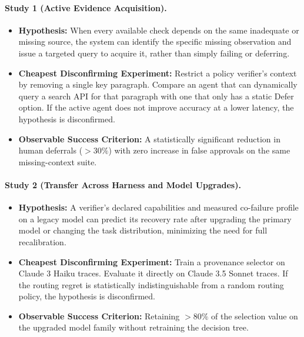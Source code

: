\documentclass[manuscript,screen,nonacm]{acmart}
\begin{document}
\paragraph{Study 1 (Active Evidence Acquisition).}
\begin{itemize}
    \item \textbf{Hypothesis:} When every available check depends on the same inadequate or missing source, the system can identify the specific missing observation and issue a targeted query to acquire it, rather than simply failing or deferring.
    \item \textbf{Cheapest Disconfirming Experiment:} Restrict a policy verifier's context by removing a single key paragraph. Compare an agent that can dynamically query a search API for that paragraph with one that only has a static Defer option. If the active agent does not improve accuracy at a lower latency, the hypothesis is disconfirmed.
    \item \textbf{Observable Success Criterion:} A statistically significant reduction in human deferrals ($>30\%$) with zero increase in false approvals on the same missing-context suite.
\end{itemize}

\paragraph{Study 2 (Transfer Across Harness and Model Upgrades).}
\begin{itemize}
    \item \textbf{Hypothesis:} A verifier's declared capabilities and measured co-failure profile on a legacy model can predict its recovery rate after upgrading the primary model or changing the task distribution, minimizing the need for full recalibration.
    \item \textbf{Cheapest Disconfirming Experiment:} Train a provenance selector on Claude 3 Haiku traces. Evaluate it directly on Claude 3.5 Sonnet traces. If the routing regret is statistically indistinguishable from a random routing policy, the hypothesis is disconfirmed.
    \item \textbf{Observable Success Criterion:} Retaining $>80\%$ of the selection value on the upgraded model family without retraining the decision tree.
\end{itemize}
\end{document}
